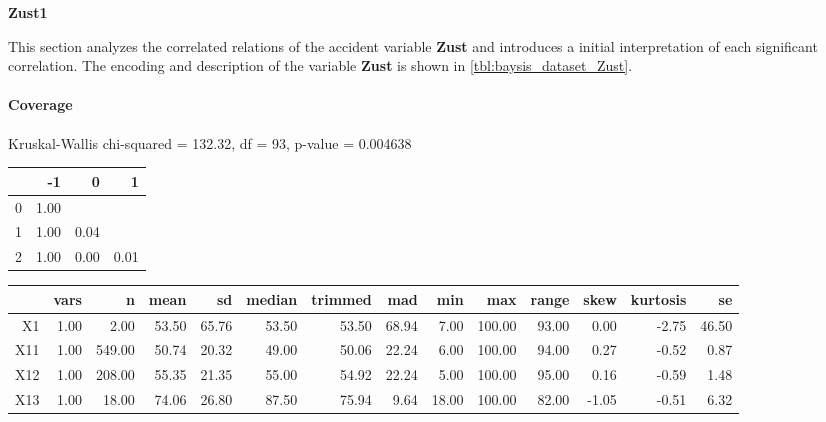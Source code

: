 \Large
\centerline{\textbf{Zust1}}
\normalsize
This section analyzes the correlated relations of the accident variable \textbf{Zust} and introduces a initial interpretation of each significant correlation. The encoding and description of the variable \textbf{Zust} is shown in \cref{tbl:baysis_dataset_Zust}.

\paragraph{Coverage}
Kruskal-Wallis chi-squared = 132.32, df = 93, p-value = 0.004638

% 
\begin{tabular}{rrrr}
  \hline
 & -1 & 0 & 1 \\ 
  \hline
0 & 1.00 &  &  \\ 
  1 & 1.00 & 0.04 &  \\ 
  2 & 1.00 & 0.00 & 0.01 \\ 
   \hline
\end{tabular}
% 
\begin{tabular}{rrrrrrrrrrrrrr}
  \hline
 & vars & n & mean & sd & median & trimmed & mad & min & max & range & skew & kurtosis & se \\ 
  \hline
X1 & 1.00 & 2.00 & 53.50 & 65.76 & 53.50 & 53.50 & 68.94 & 7.00 & 100.00 & 93.00 & 0.00 & -2.75 & 46.50 \\ 
  X11 & 1.00 & 549.00 & 50.74 & 20.32 & 49.00 & 50.06 & 22.24 & 6.00 & 100.00 & 94.00 & 0.27 & -0.52 & 0.87 \\ 
  X12 & 1.00 & 208.00 & 55.35 & 21.35 & 55.00 & 54.92 & 22.24 & 5.00 & 100.00 & 95.00 & 0.16 & -0.59 & 1.48 \\ 
  X13 & 1.00 & 18.00 & 74.06 & 26.80 & 87.50 & 75.94 & 9.64 & 18.00 & 100.00 & 82.00 & -1.05 & -0.51 & 6.32 \\ 
   \hline
\end{tabular}

